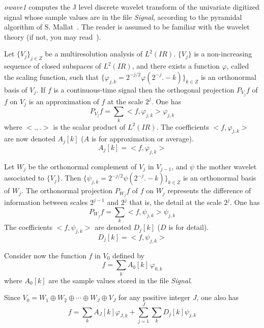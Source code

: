 \def\real{I\!\!R}


{\em owave1} computes the J level discrete wavelet transform of the univariate digitized signal whose sample values are in the file {\em Signal}, according to the pyramidal algorithm of S. Mallat~\cite{mallat:theory}. The reader is assumed to be familiar with the wavelet theory (if not, you may read~\cite{mallat:wavelet}). 

Let \( \{V_{j}\}_{j \in Z} \) be a multiresolution analysis of \( L^{2}(\real) \). \( \{V_{j}\} \) is a non-increasing sequence of closed subspaces of \( L^{2}(\real) \), and there exists a function \( \varphi \), called the scaling function, such that \( \{\varphi_{j,k} = 2^{-j/2}\varphi(2^{-j}.-k)\}_{k \in Z} \) is an orthonormal basis of \( V_{j} \). If \( f \) is a continuous-time signal then the orthogonal projection \( P_{V_{j}}f \) of \( f \) on \( V_{j} \) is an approximation of \( f \) at the scale \( 2^{j} \). One has
\[
P_{V_{j}}f = \sum_{k} <f,\varphi_{j, k}> \varphi_{j, k}
\]
where \( <.,.> \) is the scalar product of \( L^{2}(\real) \).
The coefficients \( <f,\varphi_{j, k}> \) are now denoted \( A_{j}[k] \) ($A$ is for approximation or average). 
\[
A_{j}[k] = < f,\varphi_{j,k} > 
\]

Let \( W_{j} \) be the orthonormal complement of \( V_{j} \) in \( V_{j-1} \), and \( \psi \) the mother wavelet associated to \( \{V_{j}\} \). Then \( \{\psi_{j,k} = 2^{-j/2}\psi(2^{-j}.-k)\}_{k \in Z} \) is an orthonormal basis of \( W_{j} \). The orthonormal projection \( P_{W_{j}}f \) of \( f \) on \( W_{j} \) represents the difference of information between scales \( 2^{j-1} \) and \( 2^{j} \) that is, the detail at the scale \( 2^{j} \). One has
\[
P_{W_{j}}f = \sum_{k} <f,\psi_{j, k}> \psi_{j, k}
\]
The coefficients \( <f,\psi_{j, k}> \) are denoted \( D_{j}[k] \) ($D$ is for detail).
\[
D_{j}[k] = < f,\psi_{j,k} >
\]

Consider now the function \( f \) in \( V_{0} \) defined by
\[
f = \sum_{k} A_{0}[k] \, \varphi_{0,k}
\]
where $A_{0}[k]$ are the sample values stored in the file {\em Signal}.

Since \( V_{0} = W_{1} \oplus W_{2} \oplus \cdots \oplus W_{J} \oplus V_{J} \) for any positive integer $J$, one also has
\[
f = \sum_{k} A_{J}[k] \varphi_{J,k} + \sum_{j = 1}^{J} \sum_{k} D_{j}[k] \psi_{j,k}
\]

